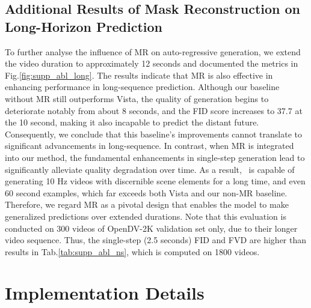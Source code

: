 
\subsection{Additional Results of Mask Reconstruction on Long-Horizon Prediction}
To further analyse the influence of MR on auto-regressive generation, we extend the video duration to approximately 12 seconds and documented the metrics in Fig.\ref{fig:supp_abl_long}. The results indicate that MR is also effective in enhancing performance in long-sequence prediction. 
Although our baseline without MR still outperforms Vista, the quality of generation begins to deteriorate notably from about 8 seconds, and the FID score increases to 37.7 at the 10 second, making it also incapable to predict the distant future. Consequently, we conclude that this baseline’s improvements cannot translate to significant advancements in long-sequence.
In contrast, when MR is integrated into our method, the fundamental enhancements in single-step generation lead to significantly alleviate quality degradation over time. As a result, \ourmethod\ is capable of generating 10 Hz videos with discernible scene elements for a long time, and even 60 second examples, which far exceeds both Vista and our non-MR baseline. Therefore, we regard MR as a pivotal design that enables the model to make generalized predictions over extended durations. Note that this evaluation is conducted on 300 videos of OpenDV-2K validation set only, due to their longer video sequence. Thus, the single-step (2.5 seconds) FID and FVD are higher than results in Tab.\ref{tab:supp_abl_ns}, which is computed on 1800 videos.
\section{Implementation Details}
